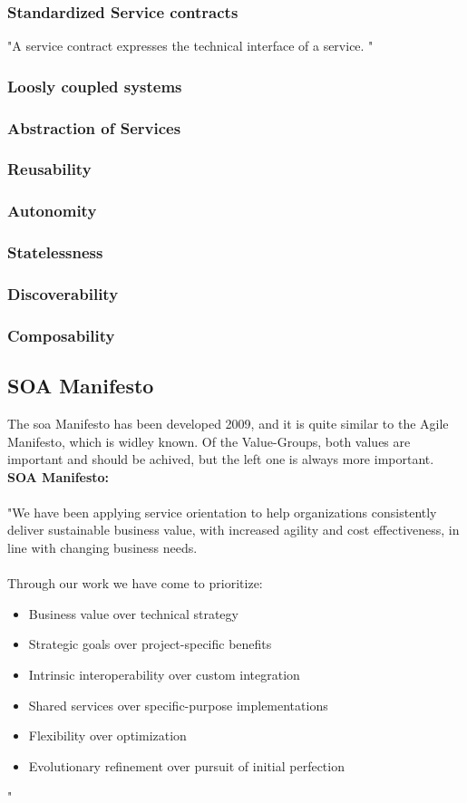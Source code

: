 \documentclass[12pt]{article}
\begin{document}
\subsubsection{Standardized Service contracts}
"A service contract expresses the technical interface of a service. "
\subsubsection{Loosly coupled systems}
\subsubsection{Abstraction of Services}
\subsubsection{Reusability}
\subsubsection{Autonomity}
\subsubsection{Statelessness}
\subsubsection{Discoverability}
\subsubsection{Composability}
\subsection{SOA Manifesto }
The \gls{soa} Manifesto has been developed 2009, and it is quite similar to the Agile Manifesto, which is widley known. Of the Value-Groups, both values are important and should be achived, but the left one is always more important. \\
\textbf{SOA Manifesto:}\\ \\
"We have been applying service orientation to help organizations 
consistently deliver sustainable business value, with increased agility
and cost effectiveness, in line with changing business needs. \\ \\
Through our work we have come to prioritize: \\
\begin{itemize}
\item Business value over technical strategy 
\item Strategic goals over project-specific benefits 
\item Intrinsic interoperability over custom integration 
\item Shared services over specific-purpose implementations 
\item Flexibility over optimization
\item Evolutionary refinement over pursuit of initial perfection
\end{itemize}" \cite{soamaifesto} 
\end{document}
